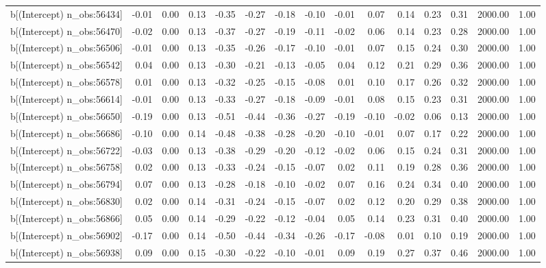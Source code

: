 \begin{table}[ht]
\begin{tabular}{rrrrrrrrrrrrrrr}
  b[(Intercept) n\_obs:56434] & -0.01 & 0.00 & 0.13 & -0.35 & -0.27 & -0.18 & -0.10 & -0.01 & 0.07 & 0.14 & 0.23 & 0.31 & 2000.00 & 1.00 \\ 
  b[(Intercept) n\_obs:56470] & -0.02 & 0.00 & 0.13 & -0.37 & -0.27 & -0.19 & -0.11 & -0.02 & 0.06 & 0.14 & 0.23 & 0.28 & 2000.00 & 1.00 \\ 
  b[(Intercept) n\_obs:56506] & -0.01 & 0.00 & 0.13 & -0.35 & -0.26 & -0.17 & -0.10 & -0.01 & 0.07 & 0.15 & 0.24 & 0.30 & 2000.00 & 1.00 \\ 
  b[(Intercept) n\_obs:56542] & 0.04 & 0.00 & 0.13 & -0.30 & -0.21 & -0.13 & -0.05 & 0.04 & 0.12 & 0.21 & 0.29 & 0.36 & 2000.00 & 1.00 \\ 
  b[(Intercept) n\_obs:56578] & 0.01 & 0.00 & 0.13 & -0.32 & -0.25 & -0.15 & -0.08 & 0.01 & 0.10 & 0.17 & 0.26 & 0.32 & 2000.00 & 1.00 \\ 
  b[(Intercept) n\_obs:56614] & -0.01 & 0.00 & 0.13 & -0.33 & -0.27 & -0.18 & -0.09 & -0.01 & 0.08 & 0.15 & 0.23 & 0.31 & 2000.00 & 1.00 \\ 
  b[(Intercept) n\_obs:56650] & -0.19 & 0.00 & 0.13 & -0.51 & -0.44 & -0.36 & -0.27 & -0.19 & -0.10 & -0.02 & 0.06 & 0.13 & 2000.00 & 1.00 \\ 
  b[(Intercept) n\_obs:56686] & -0.10 & 0.00 & 0.14 & -0.48 & -0.38 & -0.28 & -0.20 & -0.10 & -0.01 & 0.07 & 0.17 & 0.22 & 2000.00 & 1.00 \\ 
  b[(Intercept) n\_obs:56722] & -0.03 & 0.00 & 0.13 & -0.38 & -0.29 & -0.20 & -0.12 & -0.02 & 0.06 & 0.15 & 0.24 & 0.31 & 2000.00 & 1.00 \\ 
  b[(Intercept) n\_obs:56758] & 0.02 & 0.00 & 0.13 & -0.33 & -0.24 & -0.15 & -0.07 & 0.02 & 0.11 & 0.19 & 0.28 & 0.36 & 2000.00 & 1.00 \\ 
  b[(Intercept) n\_obs:56794] & 0.07 & 0.00 & 0.13 & -0.28 & -0.18 & -0.10 & -0.02 & 0.07 & 0.16 & 0.24 & 0.34 & 0.40 & 2000.00 & 1.00 \\ 
  b[(Intercept) n\_obs:56830] & 0.02 & 0.00 & 0.14 & -0.31 & -0.24 & -0.15 & -0.07 & 0.02 & 0.12 & 0.20 & 0.29 & 0.38 & 2000.00 & 1.00 \\ 
  b[(Intercept) n\_obs:56866] & 0.05 & 0.00 & 0.14 & -0.29 & -0.22 & -0.12 & -0.04 & 0.05 & 0.14 & 0.23 & 0.31 & 0.40 & 2000.00 & 1.00 \\ 
  b[(Intercept) n\_obs:56902] & -0.17 & 0.00 & 0.14 & -0.50 & -0.44 & -0.34 & -0.26 & -0.17 & -0.08 & 0.01 & 0.10 & 0.19 & 2000.00 & 1.00 \\ 
  b[(Intercept) n\_obs:56938] & 0.09 & 0.00 & 0.15 & -0.30 & -0.22 & -0.10 & -0.01 & 0.09 & 0.19 & 0.27 & 0.37 & 0.46 & 2000.00 & 1.00 \\ 

\end{tabular}
\end{table}
